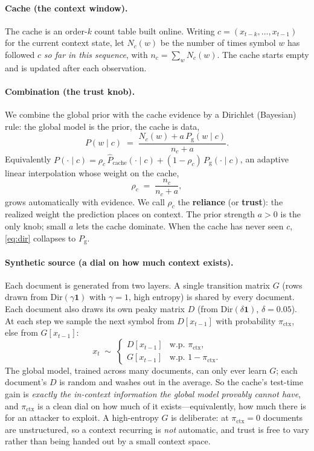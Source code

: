 \documentclass[11pt]{article}
\theoremstyle{plain}
\theoremstyle{definition}
\theoremstyle{remark}
\newcommand{\pictx}{\pi_{\text{ctx}}}
\newcommand{\Pglob}{P_{\text{g}}}
\begin{document}
\paragraph{Cache (the context window).}
The cache is an order-$k$ count table built online. Writing $c=(x_{t-k},\dots,x_{t-1})$ for
the current context state, let $N_c(w)$ be the number of times symbol $w$ has followed $c$
\emph{so far in this sequence}, with $n_c=\sum_w N_c(w)$. The cache starts empty and is
updated after each observation.

\paragraph{Combination (the trust knob).}
We combine the global prior with the cache evidence by a Dirichlet (Bayesian) rule: the
global model is the prior, the cache is data,
\begin{equation}\label{eq:dir}
P(w\mid c)\;=\;\frac{N_c(w)+a\,\Pglob(w\mid c)}{n_c+a}.
\end{equation}
Equivalently $P(\cdot\mid c)=\rho_c\,\widehat{P}_{\text{cache}}(\cdot\mid c)+(1-\rho_c)\,
\Pglob(\cdot\mid c)$, an adaptive linear interpolation whose weight on the cache,
\begin{equation}\label{eq:reliance}
\rho_c \;=\; \frac{n_c}{n_c+a},
\end{equation}
grows automatically with evidence. We call $\rho_c$ the \textbf{reliance} (or
\textbf{trust}): the realized weight the prediction places on context. The prior strength
$a>0$ is the only knob; small $a$ lets the cache dominate. When the cache has never seen
$c$, \eqref{eq:dir} collapses to $\Pglob$.

\paragraph{Synthetic source (a dial on how much context exists).}
Each document is generated from two layers. A single transition matrix $G$ (rows drawn from
$\mathrm{Dir}(\gamma\mathbf 1)$ with $\gamma=1$, high entropy) is shared by every document. Each
document also draws its own peaky matrix $D$ (from $\mathrm{Dir}(\delta\mathbf 1)$,
$\delta=0.05$). At each step we sample the next symbol from $D[x_{t-1}]$ with probability
$\pictx$, else from $G[x_{t-1}]$:
\begin{equation}\label{eq:source}
x_t \;\sim\; \begin{cases}D[x_{t-1}] & \text{w.p. } \pictx,\\[2pt] G[x_{t-1}] &
\text{w.p. } 1-\pictx.\end{cases}
\end{equation}
The global model, trained across many documents, can only ever learn $G$; each document's
$D$ is random and washes out in the average. So the cache's test-time gain is \emph{exactly
the in-context information the global model provably cannot have}, and $\pictx$ is a clean
dial on how much of it exists---equivalently, how much there is for an attacker to exploit.
A high-entropy $G$ is deliberate: at $\pictx=0$ documents are unstructured, so a context
recurring is \emph{not} automatic, and trust is free to vary rather than being handed out by
a small context space.
\end{document}
